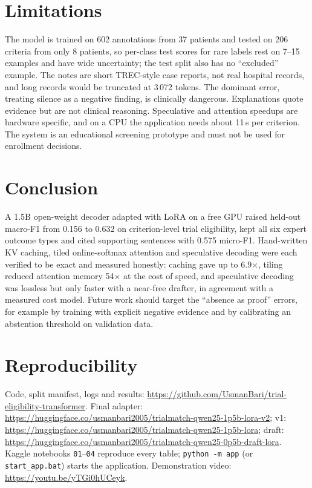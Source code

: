 \documentclass[conference]{IEEEtran}
\newcommand{\repo}{\url{https://github.com/UsmanBari/trial-eligibility-transformer}}
\newcommand{\videolink}{\url{https://youtu.be/yTGi0hUCeyk}}
\begin{document}
\section{Limitations}
The model is trained on 602 annotations from 37 patients and tested on 206 criteria from only 8 patients, so per-class test scores for rare labels rest on 7--15 examples and have wide uncertainty; the test split also has no ``excluded'' example. The notes are short TREC-style case reports, not real hospital records, and long records would be truncated at 3\,072 tokens. The dominant error, treating silence as a negative finding, is clinically dangerous. Explanations quote evidence but are not clinical reasoning. Speculative and attention speedups are hardware specific, and on a CPU the application needs about 11\,s per criterion. The system is an educational screening prototype and must not be used for enrollment decisions.

\section{Conclusion}
A 1.5B open-weight decoder adapted with LoRA on a free GPU raised held-out macro-F1 from 0.156 to 0.632 on criterion-level trial eligibility, kept all six expert outcome types and cited supporting sentences with 0.575 micro-F1. Hand-written KV caching, tiled online-softmax attention and speculative decoding were each verified to be exact and measured honestly: caching gave up to 6.9$\times$, tiling reduced attention memory 54$\times$ at the cost of speed, and speculative decoding was lossless but only faster with a near-free drafter, in agreement with a measured cost model. Future work should target the ``absence as proof'' errors, for example by training with explicit negative evidence and by calibrating an abstention threshold on validation data.

\section*{Reproducibility}
Code, split manifest, logs and results: \repo. Final adapter: \url{https://huggingface.co/usmanbari2005/trialmatch-qwen25-1p5b-lora-v2}; v1: \url{https://huggingface.co/usmanbari2005/trialmatch-qwen25-1p5b-lora}; draft: \url{https://huggingface.co/usmanbari2005/trialmatch-qwen25-0p5b-draft-lora}. Kaggle notebooks \texttt{01}--\texttt{04} reproduce every table; \texttt{python -m app} (or \texttt{start\_app.bat}) starts the application. Demonstration video: \videolink.
\end{document}
